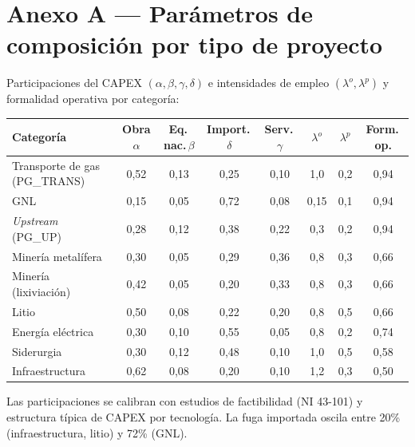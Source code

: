 \documentclass[11pt]{article}
\begin{document}
\section{Anexo A --- Parámetros de composición por tipo de proyecto}
Participaciones del CAPEX $(\alpha,\beta,\gamma,\delta)$ e intensidades de empleo $(\lambda^o,\lambda^p)$ y formalidad operativa por categoría:
\begin{center}\footnotesize
\begin{tabular}{lcccccc c}
\toprule
Categoría & Obra $\alpha$ & Eq.\,nac.\,$\beta$ & Import.\,$\delta$ & Serv.\,$\gamma$ & $\lambda^o$ & $\lambda^p$ & Form.\,op. \\
\midrule
Transporte de gas (PG\_TRANS) & 0{,}52 & 0{,}13 & 0{,}25 & 0{,}10 & 1{,}0 & 0{,}2 & 0{,}94\\
GNL & 0{,}15 & 0{,}05 & 0{,}72 & 0{,}08 & 0{,}15 & 0{,}1 & 0{,}94\\
\emph{Upstream} (PG\_UP) & 0{,}28 & 0{,}12 & 0{,}38 & 0{,}22 & 0{,}3 & 0{,}2 & 0{,}94\\
Minería metalífera & 0{,}30 & 0{,}05 & 0{,}29 & 0{,}36 & 0{,}8 & 0{,}3 & 0{,}66\\
Minería (lixiviación) & 0{,}42 & 0{,}05 & 0{,}20 & 0{,}33 & 0{,}8 & 0{,}3 & 0{,}66\\
Litio & 0{,}50 & 0{,}08 & 0{,}22 & 0{,}20 & 0{,}8 & 0{,}5 & 0{,}66\\
Energía eléctrica & 0{,}30 & 0{,}10 & 0{,}55 & 0{,}05 & 0{,}8 & 0{,}2 & 0{,}74\\
Siderurgia & 0{,}30 & 0{,}12 & 0{,}48 & 0{,}10 & 1{,}0 & 0{,}5 & 0{,}58\\
Infraestructura & 0{,}62 & 0{,}08 & 0{,}20 & 0{,}10 & 1{,}2 & 0{,}3 & 0{,}50\\
\bottomrule
\end{tabular}
\end{center}
\noindent Las participaciones se calibran con estudios de factibilidad (NI 43-101) y estructura típica de CAPEX por tecnología. La fuga importada oscila entre 20\% (infraestructura, litio) y 72\% (GNL).
\end{document}
